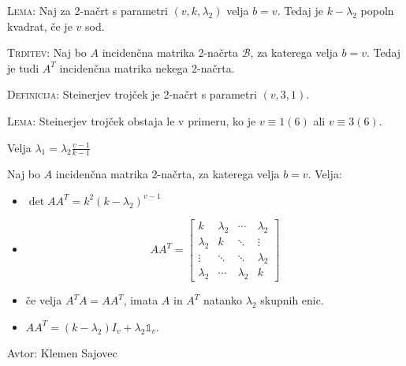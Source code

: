 \documentclass[8pt,a4paper]{amsart}
\theoremstyle{definition} %
\theoremstyle{plain} %
\begin{document}
\textsc{Lema:} Naj za 2-načrt s parametri $(v,k,\lambda_2)$ velja $b=v$. Tedaj je $k-\lambda_2$ popoln kvadrat, če je $v$ sod.

\textsc{Trditev:} Naj bo $A$ incidenčna matrika 2-načrta $\mathcal{B}$, za katerega velja $b=v$. Tedaj je tudi $A^T$ incidenčna matrika nekega 2-načrta.

\textsc{Definicija:} Steinerjev trojček je 2-načrt s parametri $(v,3,1)$.

\textsc{Lema:} Steinerjev trojček obstaja le v primeru, ko je $v \equiv 1 (6)$ ali $v \equiv 3 (6)$.

Velja $\lambda_1 = \lambda_2 \frac{v-1}{k-1}$

Naj bo $A$ incidenčna matrika 2-načrta, za katerega velja $b=v$. Velja:
\begin{itemize}
\item $\det{AA^T}=k^2(k-\lambda_2)^{v-1}$
\item
$$
AA^T =  \left[ \begin{matrix}
k & \lambda_2 & \cdots & \lambda_2 \\
\lambda_2 & k & \ddots & \vdots \\
\vdots & \ddots &  \ddots & \lambda_2 \\
\lambda_2 & \cdots & \lambda_2 & k
\end{matrix} \right]
$$
\item če velja $A^TA = AA^T$, imata $A$ in $A^T$ natanko $\lambda_2$ skupnih enic.
\item $AA^T = (k-\lambda_2)I_v + \lambda_2 \mathbb{1}_v$.
\end{itemize}


Avtor: Klemen Sajovec
\end{document}

